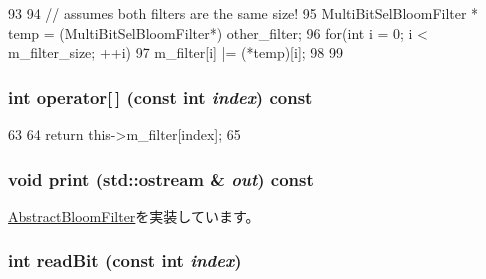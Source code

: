 \begin{DoxyCode}
93 {
94     // assumes both filters are the same size!
95     MultiBitSelBloomFilter * temp = (MultiBitSelBloomFilter*) other_filter;
96     for(int i = 0; i < m_filter_size; ++i){
97         m_filter[i] |= (*temp)[i];
98     }
99 }
\end{DoxyCode}
\hypertarget{classMultiBitSelBloomFilter_ad7ab71ad11e6bca06c3534af5707d8fc}{
\subsubsection[{operator[]}]{\setlength{\rightskip}{0pt plus 5cm}int operator\mbox{[}$\,$\mbox{]} (const int {\em index}) const}}
\label{classMultiBitSelBloomFilter_ad7ab71ad11e6bca06c3534af5707d8fc}



\begin{DoxyCode}
63     {
64         return this->m_filter[index];
65     }
\end{DoxyCode}
\hypertarget{classMultiBitSelBloomFilter_ac55fe386a101fbae38c716067c9966a0}{
\subsubsection[{print}]{\setlength{\rightskip}{0pt plus 5cm}void print (std::ostream \& {\em out}) const}}
\label{classMultiBitSelBloomFilter_ac55fe386a101fbae38c716067c9966a0}


\hyperlink{classAbstractBloomFilter_a3ea5f7af5db62cc24f4e40df9ea5c971}{AbstractBloomFilter}を実装しています。\hypertarget{classMultiBitSelBloomFilter_a6f8a98d0f38a8d122d4cbf87323484eb}{
\subsubsection[{readBit}]{\setlength{\rightskip}{0pt plus 5cm}int readBit (const int {\em index})}}
\label{classMultiBitSelBloomFilter_a6f8a98d0f38a8d122d4cbf87323484eb}


